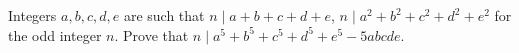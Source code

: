 Integers $a, b, c, d, e$ are such that $n \mid a + b + c + d + e$, $n \mid a^2 + b^2 + c^2 + d^2 + e^2$ for the odd integer $n$. Prove that $n \mid a^5 + b^5 + c^5 + d^5 + e^5 - 5abcde$.
